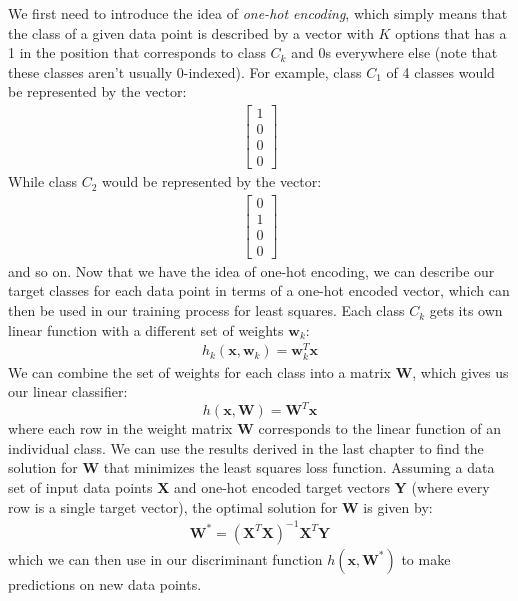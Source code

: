 We first need to introduce the idea of \textit{one-hot encoding}, which simply means that the class of a given data point is described by a vector with $K$ options that has a 1 in the position that corresponds to class $C_{k}$ and 0s everywhere else (note that these classes aren't usually 0-indexed). For example, class $C_{1}$ of 4 classes would be represented by the vector:
\begin{align}
    \begin{bmatrix}
    	1 \\
        0 \\
        0 \\
        0
    \end{bmatrix}
\end{align}
While class $C_{2}$ would be represented by the vector:
\begin{align}
    \begin{bmatrix}
    	0 \\
        1 \\
        0 \\
        0
    \end{bmatrix}
\end{align}
and so on. Now that we have the idea of one-hot encoding, we can describe our target classes for each data point in terms of a one-hot encoded vector, which can then be used in our training process for least squares. \newline \newline
Each class $C_{k}$ gets its own linear function with a different set of weights $\textbf{w}_{k}$:
\begin{align*}
	h_{k}(\textbf{x}, \textbf{w}_{k}) = \textbf{w}_{k}^{T}\textbf{x}
\end{align*}
We can combine the set of weights for each class into a matrix $\textbf{W}$, which gives us our linear classifier:
\begin{equation}
	h(\textbf{x}, \textbf{W}) = \textbf{W}^{T}\textbf{x}
\end{equation}
where each row in the weight matrix \textbf{W} corresponds to the linear function of an individual class. We can use the results derived in the last chapter to find the solution for \textbf{W} that minimizes the least squares loss function. Assuming a data set of input data points \textbf{X} and one-hot encoded target vectors \textbf{Y} (where every row is a single target vector), the optimal solution for \textbf{W} is given by:
\begin{align*}
	\textbf{W}^{*} = (\textbf{X}^{T}\textbf{X})^{-1}\textbf{X}^{T}\textbf{Y}
\end{align*}
which we can then use in our discriminant function $h(\textbf{x}, \textbf{W}^{*})$ to make predictions on new data points.

